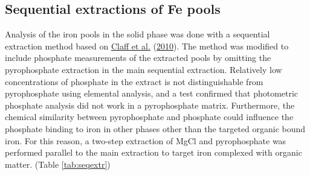 \documentclass[a4paper,11pt]{article}
\begin{document}
\hypertarget{sequential-extractions-of-fe-pools}{%
\subsection{Sequential extractions of Fe pools}\label{sequential-extractions-of-fe-pools}}

Analysis of the iron pools in the solid phase was done with a sequential extraction method based on \protect\hyperlink{ref-claffSequentialExtractionProcedure2010}{Claff et al.} (\protect\hyperlink{ref-claffSequentialExtractionProcedure2010}{2010}). The method was modified to include phosphate measurements of the extracted pools by omitting the pyrophosphate extraction in the main sequential extraction. Relatively low concentrations of phosphate in the extract is not distinguishable from pyrophosphate using elemental analysis, and a test confirmed that photometric phosphate analysis did not work in a pyrophosphate matrix. Furthermore, the chemical similarity between pyrophosphate and phosphate could influence the phosphate binding to iron in other phases other than the targeted organic bound iron. For this reason, a two-step extraction of MgCl and pyrophosphate was performed parallel to the main extraction to target iron complexed with organic matter. (Table \ref{tab:seqextr})
\end{document}
